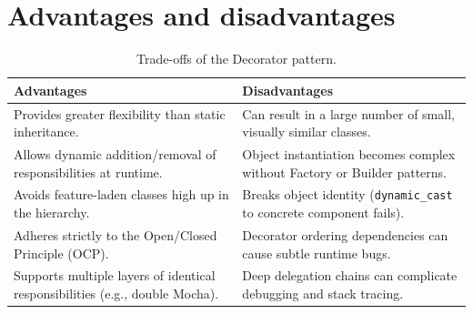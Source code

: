 \documentclass[11pt,a4paper]{report}
\begin{document}
\section{Advantages and disadvantages}
\begin{table}[htbp]
\centering
\caption{Trade-offs of the Decorator pattern.}
\begin{tabularx}{\textwidth}{@{}YY@{}}
\toprule
\textbf{Advantages} & \textbf{Disadvantages} \\
\midrule
Provides greater flexibility than static inheritance. & Can result in a large number of small, visually similar classes. \\
Allows dynamic addition/removal of responsibilities at runtime. & Object instantiation becomes complex without Factory or Builder patterns. \\
Avoids feature-laden classes high up in the hierarchy. & Breaks object identity (\texttt{dynamic\_cast} to concrete component fails). \\
Adheres strictly to the Open/Closed Principle (OCP). & Decorator ordering dependencies can cause subtle runtime bugs. \\
Supports multiple layers of identical responsibilities (e.g., double Mocha). & Deep delegation chains can complicate debugging and stack tracing. \\
\bottomrule
\end{tabularx}
\end{table}
\end{document}
